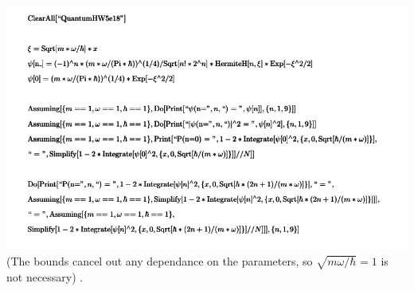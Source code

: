 \documentclass[12pt]{article}
\begin{document}
\includegraphics[width=\linewidth]{hw5ohmygod.png}
(The bounds cancel out any dependance on the parameters, so $\sqrt{m\omega/\hbar}=1$ is not necessary) .\\
\end{document}

